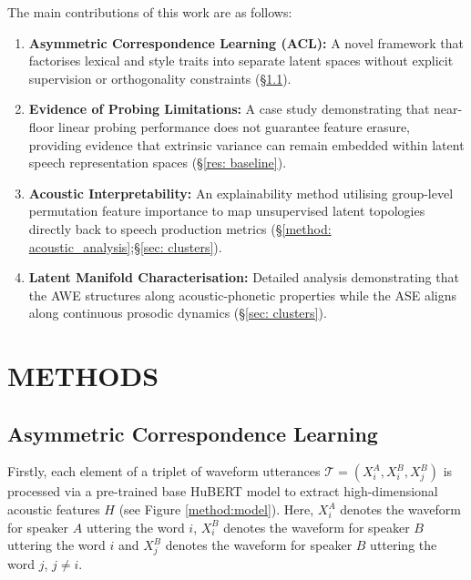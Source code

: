 \documentclass[conference,letterpaper]{IEEEtran}
\begin{document}
The main contributions of this work are as follows:
\begin{enumerate}
    \item \textbf{Asymmetric Correspondence Learning (ACL):} A novel framework that factorises lexical and style traits into separate latent spaces without explicit supervision or orthogonality constraints (\S\ref{method: ACL}).
    \item \textbf{Evidence of Probing Limitations:} A case study demonstrating that near-floor linear probing performance does not guarantee feature erasure, providing evidence that extrinsic variance can remain embedded within latent speech representation spaces (\S\ref{res: baseline}).
    \item \textbf{Acoustic Interpretability:} An explainability method utilising group-level permutation feature importance to map unsupervised latent topologies directly back to speech production metrics (\S \ref{method: acoustic_analysis};\S\ref{sec: clusters}).
    \item \textbf{Latent Manifold Characterisation:} Detailed analysis demonstrating that the AWE structures along acoustic-phonetic properties while the ASE aligns along continuous prosodic dynamics (\S\ref{sec: clusters}).
\end{enumerate}



\section{METHODS}
\subsection{Asymmetric Correspondence Learning}
\label{method: ACL}

Firstly, each element of a triplet of waveform utterances $\mathcal{T} = (X^{A}_{i}, X^{B}_{i},X^{B}_{j})$ is processed via a pre-trained base HuBERT \cite{DBLP:journals/corr/abs-2106-07447} model to extract high-dimensional acoustic features $H$ (see Figure \ref{method:model}). Here, $X^{A}_{i}$ denotes the waveform for speaker $A$ uttering the word $i$, $X^{B}_{i}$ denotes the waveform for speaker $B$ uttering the word $i$ and $X^{B}_{j}$ denotes the waveform for speaker $B$ uttering the word $j$, $j \neq i$. 
\end{document}
